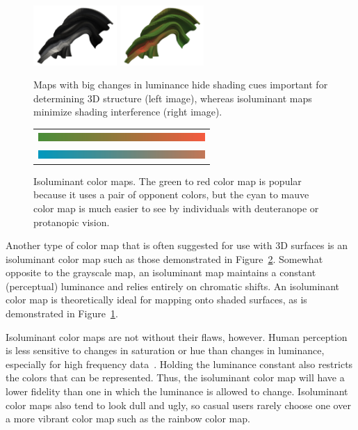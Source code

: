 \documentclass{acmsiggraph}               %
\newcommand{\lcite}[1]{~\cite{#1}}
\begin{document}
\begin{figure}
  \centering
  \includegraphics[width=1.25in]{images/GrayscaleShading}
  \includegraphics[width=1.25in]{images/Green2RedShading}
  \caption{Maps with big changes in luminance hide shading cues important
    for determining 3D structure (left image), whereas isoluminant maps
    minimize shading interference (right image).}
  \label{fig:LuminanceVsShading}
\end{figure}

\begin{figure}
  \centering
  \begin{tabular}{c}
    \includegraphics[width=2.5in]{images/Green2RedBar} \\
    \includegraphics[width=2.5in]{images/Cyan2MauveBar}
  \end{tabular}
  \caption{Isoluminant color maps.  The green to red color map is popular
    because it uses a pair of opponent colors, but the cyan to mauve color
    map is much easier to see by individuals with deuteranope or protanopic
    vision.}
  \label{fig:IsoluminantColorMap}
\end{figure}
Another type of color map that is often suggested for use with 3D surfaces
is an isoluminant color map such as those demonstrated in
Figure~\ref{fig:IsoluminantColorMap}.  Somewhat opposite to the grayscale
map, an isoluminant map maintains a constant (perceptual) luminance and
relies entirely on chromatic shifts.  An isoluminant color map is
theoretically ideal for mapping onto shaded surfaces, as is demonstrated in
Figure~\ref{fig:LuminanceVsShading}.

Isoluminant color maps are not without their flaws, however.  Human
perception is less sensitive to changes in saturation or hue than changes
in luminance, especially for high frequency data\lcite{Rogowitz96}.
Holding the luminance constant also restricts the colors that can be
represented.  Thus, the isoluminant color map will have a lower fidelity
than one in which the luminance is allowed to change.  Isoluminant color
maps also tend to look dull and ugly, so casual users rarely
choose one over a more vibrant color map such as the rainbow color map.
\end{document}

